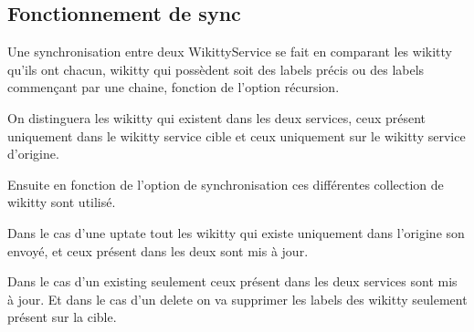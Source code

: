 \subsection{Fonctionnement de sync}


Une synchronisation entre deux WikittyService se fait en comparant les wikitty
qu'ils ont chacun, wikitty qui possèdent soit des labels précis ou des labels
commençant par une chaine, fonction de l'option récursion.

On distinguera les wikitty qui existent dans les deux services, ceux présent
uniquement dans le wikitty service cible et ceux uniquement sur le wikitty
service d'origine.

Ensuite en fonction de l'option de synchronisation ces différentes collection de
wikitty sont utilisé.

Dans le cas d'une uptate tout les wikitty qui existe uniquement dans l'origine
son envoyé, et ceux présent dans les deux sont mis à jour.

Dans le cas d'un existing seulement ceux présent dans les deux services sont mis à jour.
Et dans le cas d'un delete on va supprimer les labels des wikitty seulement
présent sur la cible.

